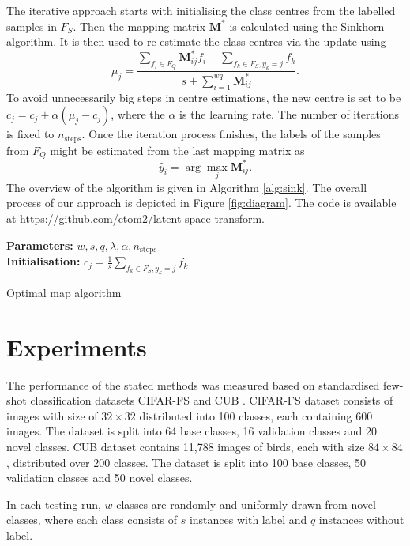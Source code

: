 \documentclass[letterpaper]{article} \usepackage{aaai20}  \usepackage{times}  \usepackage{helvet} \usepackage{courier}  \usepackage[hyphens]{url}  \usepackage{graphicx} \urlstyle{rm} \def\UrlFont{\rm}  \usepackage{graphicx}  \frenchspacing  \setlength{\pdfpagewidth}{8.5in}  \setlength{\pdfpageheight}{11in}  \usepackage[ruled,vlined]{algorithm2e}
\begin{document}
The iterative approach starts with initialising the class centres from the labelled samples in $F_S$. 
Then the mapping matrix $\mathbf M^*$ is calculated using the Sinkhorn algorithm. It is then used to re-estimate the class centres via the update using
\[
    \mu_j=\frac{\sum_{f_i \in F_Q}\mathbf M^*_{ij}f_i+\sum_{f_k\in F_S, y_k = j}f_k}{s + \sum_{i=1}^{wq}\mathbf M^*_{ij}}.
\]
To avoid unnecessarily big steps in centre estimations, the new centre is set to be $c_j = c_j + \alpha(\mu_j-c_j)$, where the $\alpha$ is the learning rate. The number of iterations is fixed to $n_{\mathrm{steps}}$. Once the iteration process finishes, the labels of the samples from $F_Q$ might be estimated
from the last mapping matrix as 
\[
    \hat y_i = \arg\max_j \mathbf M^*_{ij}.
\]
The overview of the algorithm is given in Algorithm \ref{alg:sink}. The overall process of our approach is depicted in Figure \ref{fig:diagram}. The code is available at https://github.com/ctom2/latent-space-transform.

\begin{algorithm}
\SetAlgoLined
\textbf{Parameters:} $w,s,q,\lambda,\alpha,n_{\mathrm{steps}}$\\
\textbf{Initialisation:} $c_j=\frac{1}{s}\sum_{f_k\in F_S, y_k = j}f_k$\\
 \caption{Optimal map algorithm}
 \label{alg:sink}
\end{algorithm}

\section{Experiments}
The performance of the stated methods was measured based on standardised few-shot classification datasets CIFAR-FS \cite{bertinetto2019metalearning} and CUB \cite{WahCUB_200_2011}. CIFAR-FS dataset consists of images with size of $32\times 32$ distributed into 100 classes, each containing 600 images. The dataset is split into 64 base classes, 16 validation classes and 20 novel classes. CUB dataset contains 11,788 images of birds, each with size $84\times 84$, distributed over 200 classes. The dataset is split into 100 base classes, 50 validation classes and 50 novel classes.

In each testing run, $w$ classes are randomly and uniformly drawn from novel classes, where each class consists of $s$ instances with label and $q$ instances without label.
\end{document}
